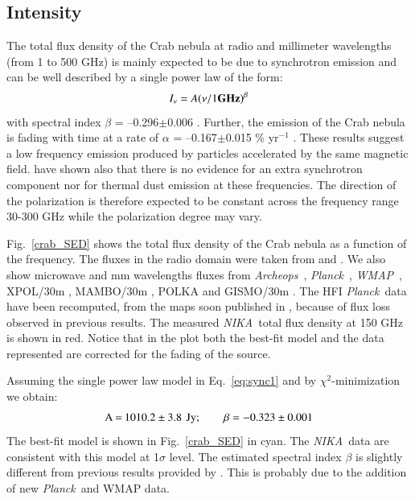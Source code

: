 \documentclass[twocolumn,traditabstract]{aa}
\def\NIKA{\textit{NIKA}}
\def\Archeops{\textit{Archeops}}
\def\Planck{\textit{Planck}}
\def\WMAP{\textit{WMAP}}
\begin{document}
\subsection{Intensity}
The total flux density of the Crab nebula at radio and millimeter
wavelengths (from 1 to 500 GHz) is mainly expected to be due to synchrotron emission and can be
well described by a single power law of the form:
\begin{equation}
I_{\nu} = A(\nu / 1 {\bf GHz})^{\beta}
\label{eq:sync1}
\end{equation}
with spectral index $\beta$ = --0.296$\pm$0.006 \citep{baars1977absolute,macias2010}. Further, the emission of the Crab nebula is fading with time at a rate of $\alpha$ = --0.167$\pm$0.015 \% yr$^{-1}$ \citep{aller1985decrease}. 
These results suggest a low frequency emission produced by particles accelerated by the same magnetic field. \cite{macias2010} have shown also that there is no evidence for an extra synchrotron component nor for thermal dust emission at these frequencies. The direction of the polarization is therefore expected to be constant across the frequency range 30-300 GHz while the polarization degree may vary.

Fig.~\ref{crab_SED} shows the total flux density of the Crab nebula as a function of the frequency. The fluxes in the radio domain were taken from \cite{dmitrenko1970absolute} and \cite{1971IzVUZ..14..157V}. We also show microwave and mm wavelengths fluxes from \Archeops\ \citep{macias2007archeops}, \Planck\ \citep{2015arXiv150702058P}, \WMAP\ \citep{2011ApJS..192...19W}, XPOL/30m \citep{aumont2010}, MAMBO/30m \citep{2002A&A...386.1044B}, POLKA \citep{2014PASP..126.1027W} and GISMO/30m \citep{2011ApJ...734...54A}. The HFI \Planck\ data have been recomputed, from the maps soon published in \cite{planck2018}, because of flux loss observed in previous results. The measured \NIKA\ total flux density at 150 GHz is shown in red. 
Notice that in the plot both the best-fit model and the data represented are corrected for the fading of the source.

Assuming the single power law model in Eq.~\ref{eq:sync1} and
by $\chi^2$-minimization we obtain:
$$\setlength\arraycolsep{0.1em}
 \begin{array}{rclcl}
  \textrm{A}&=& 1010.2\pm3.8 & & \textrm{Jy}; \quad \quad  \textrm{$\beta$} = - 0.323\pm0.001\\
 \end{array}
$$
The best-fit model is shown in Fig.~\ref{crab_SED} in cyan.
The \NIKA\ data are consistent with this model at 1$\sigma$ level.
The estimated spectral index $\beta$ is slightly different from previous results provided by \cite{macias2010}. This 
is probably due to the addition of new \Planck\ and  WMAP data.
\end{document}
